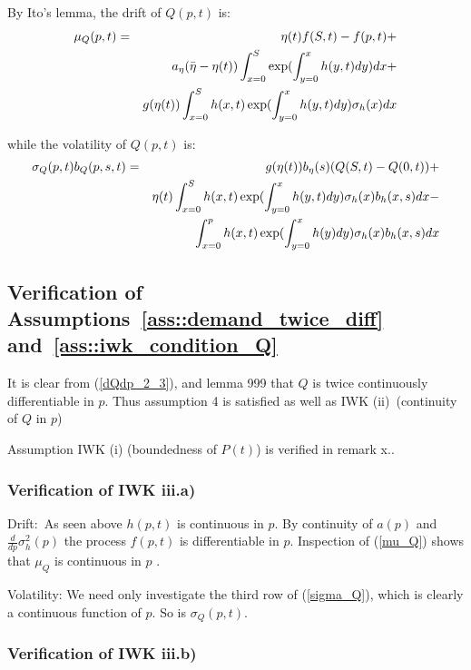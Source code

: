 \documentclass{article}
\begin{document}
By Ito's lemma, the drift of $Q(p,t)$ is:%
\begin{eqnarray}
\mu _{Q}(p,t) &=&\eta (t)f(S,t)-f(p,t)+  \label{mu_Q} \\
&&a_{\eta }(\bar{\eta}-\eta (t))\int_{x=0}^{S}\exp ({%
\int_{y=0}^{x}h(y,t)dy)dx+}  \notag \\
&&g(\eta (t))\int_{x=0}^{S}{h(x,t)}\exp ({\int_{y=0}^{x}h(y,t)dy)\sigma
_{h}(x)dx}  \notag
\end{eqnarray}

while the volatility of $Q(p,t)$ is:%
\begin{eqnarray}
\sigma _{Q}(p,t)b_{Q}(p,s,t) &=&g(\eta (t))b_{\eta }(s)(Q(S,t)-Q(0,t))+
\label{sigma_Q} \\
&&\eta (t)\int_{x=0}^{S}{h(x,t)}\exp ({\int_{y=0}^{x}h(y,t)dy)}\sigma
_{h}(x)b_{h}(x,s)dx-  \notag \\
&&\int_{x=0}^{p}{h(x,t)}\exp ({\int_{y=0}^{x}h(y)dy)}\sigma
_{h}(x)b_{h}(x,s)dx  \notag
\end{eqnarray}

\subsection{Verification of Assumptions~\ref{ass::demand_twice_diff} and~\ref{ass::iwk_condition_Q}}

It is clear from (\ref{dQdp_2_3}), and lemma 999 that $Q$ is twice
continuously differentiable in $p$. Thus assumption 4 is satisfied as well
as IWK (ii)\ (continuity of $Q$ in $p$)

Assumption IWK (i) (boundedness of $P(t)$) is verified in remark x..

\subsubsection{Verification of IWK iii.a)}

Drift:\ As seen above $h(p,t)$ is continuous in $p$.  By continuity of $a(p)$
and $\frac{d}{dp}\sigma _{h}^{2}(p)$ the process $f(p,t)$ is differentiable
in $p$. Inspection of (\ref{mu_Q}) shows that $\mu _{Q}$ is continuous in $p$%
.

Volatility: We need only investigate the third row of (\ref{sigma_Q}), which
is clearly a continuous function of $p$. So is $\sigma _{Q}(p,t)$.

\bigskip

\subsubsection{Verification of IWK iii.b)}
\end{document}
